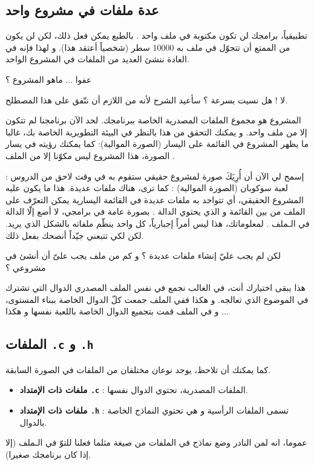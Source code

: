 \subsection{عدة ملفات في مشروع واحد}
تطبيقياً، برامجك لن تكون مكتوبة في ملف واحد
.
بالطبع يمكن فعل ذلك، لكن لن يكون من الممتع أن تتجوّل في ملف به 10000 سطر (شخصياً أعتقد هذا). و لهذا فإنه في العادة ننشئ العديد من الملفات في المشروع الواحد.
\begin{question}
  عفوا ... ماهو المشروع ؟
\end{question}
لا ! هل نسيت بسرعة ؟ سأعيد الشرح لأنه من اللازم أن نتّفق على هذا المصطلح.

المشروع هو مجموع الملفات المصدرية الخاصة ببرنامجك. لحد الآن برنامجنا لم تتكون إلا من ملف واحد. و يمكنك التحقق من هذا بالنظر في البيئة التطويرية الخاصة بك، غالبا ما يظهر المشروع في القائمة على اليسار (الصورة الموالية):
كما يمكنك رؤيته في يسار الصورة، هذا المشروع ليس مكوّنا إلا من الملف
.

إسمح لي الآن أن أُرِيَكَ صورة لمشروع حقيقي ستقوم به في وقت لاحق من الدروس : لعبة سوكوبان (الصورة الموالية) :
كما ترى، هناك ملفات عديدة. هذا ما يكون عليه المشروع الحقيقي، أي تتواجد به ملفات عديدة في القائمة اليسارية  يمكن التعرّف على الملف
من بين القائمة و الذي يحتوي الدالة
.
بصورة عامة في برامجي، لا أضع إلّا الدالة
في الـملف
.
لمعلوماتك، هذا ليس أمراً إجبارياً، كل واحد ينظّم ملفاته بالشكل الذي يريد. لكن لكي تتبعني جيّداً أنصحك بفعل ذلك.
\begin{question}
  لكن لم يجب عليّ إنشاء ملفات عديدة ؟ و كم من ملف يجب علىّ أن أنشئ في مشروعي ؟
\end{question}
هذا يبقى اختيارك أنت، في الغالب نجمع في نفس الملف المصدري الدوال التي تشترك في الموضوع الذي تعالجه. و هكذا ففي الملف
جمعت كلّ الدوال الخاصة ببناء المستوى، و في الملف
قمت بتجميع الدوال الخاصة باللعبة نفسها و هكذا ...

\subsection{الملفات
\texttt{\textenglish{.c}}
و
\texttt{\textenglish{.h}}}
كما يمكنك أن تلاحظ، يوجد نوعان مختلفان من الملفات في الصورة السابقة.
\begin{itemize}
  \item \textbf{ملفات ذات الإمتداد
\texttt{\textenglish{.c}}}
: الملفات المصدرية، تحتوي الدوال نفسها.
  \item \textbf{ملفات ذات الإمتداد
\texttt{\textenglish{.h}}}
: تسمى الملفات الرأسية و هي تحتوي النماذج الخاصة بالدوال.
\end{itemize}
عموما، انه لمن النادر وضع نماذج في الملفات من صيغة
مثلما فعلنا للتوّ في الـملف
(إلا إذا كان برنامجك صغيرا).

